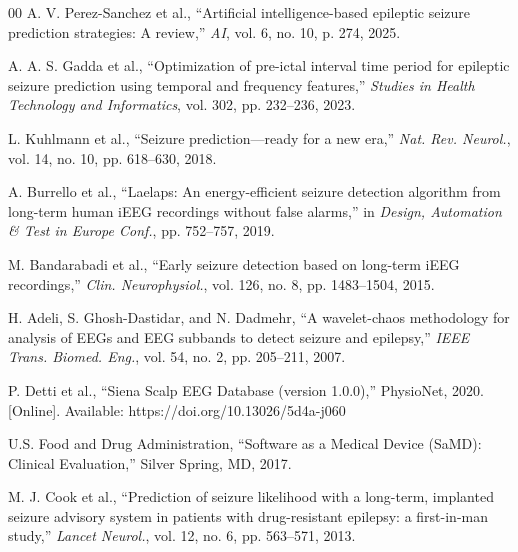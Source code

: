 \documentclass[conference]{IEEEtran}
\begin{document}
\begin{thebibliography}{00}
 A. V. Perez-Sanchez et al., ``Artificial intelligence-based epileptic seizure prediction strategies: A review,'' \textit{AI}, vol. 6, no. 10, p. 274, 2025.

 A. A. S. Gadda et al., ``Optimization of pre-ictal interval time period for epileptic seizure prediction using temporal and frequency features,'' \textit{Studies in Health Technology and Informatics}, vol. 302, pp. 232--236, 2023.

 L. Kuhlmann et al., ``Seizure prediction---ready for a new era,'' \textit{Nat. Rev. Neurol.}, vol. 14, no. 10, pp. 618--630, 2018.

 A. Burrello et al., ``Laelaps: An energy-efficient seizure detection algorithm from long-term human iEEG recordings without false alarms,'' in \textit{Design, Automation \& Test in Europe Conf.}, pp. 752--757, 2019.

 M. Bandarabadi et al., ``Early seizure detection based on long-term iEEG recordings,'' \textit{Clin. Neurophysiol.}, vol. 126, no. 8, pp. 1483--1504, 2015.

 H. Adeli, S. Ghosh-Dastidar, and N. Dadmehr, ``A wavelet-chaos methodology for analysis of EEGs and EEG subbands to detect seizure and epilepsy,'' \textit{IEEE Trans. Biomed. Eng.}, vol. 54, no. 2, pp. 205--211, 2007.

 P. Detti et al., ``Siena Scalp EEG Database (version 1.0.0),'' PhysioNet, 2020. [Online]. Available: https://doi.org/10.13026/5d4a-j060

 U.S. Food and Drug Administration, ``Software as a Medical Device (SaMD): Clinical Evaluation,'' Silver Spring, MD, 2017.

 M. J. Cook et al., ``Prediction of seizure likelihood with a long-term, implanted seizure advisory system in patients with drug-resistant epilepsy: a first-in-man study,'' \textit{Lancet Neurol.}, vol. 12, no. 6, pp. 563--571, 2013.

\end{thebibliography}
\end{document}
